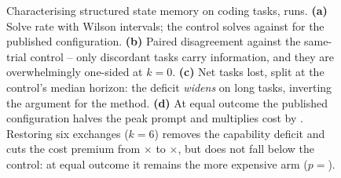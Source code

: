 \begin{figure}[t]
\caption{Characterising structured state memory on \EOneTasks{} coding tasks,
\EOneRuns{} runs. \textbf{(a)} Solve rate with Wilson intervals; the control
solves \SolveBase{} against \SolveTailZero{} for the published configuration.
\textbf{(b)} Paired disagreement against the same-trial control -- only
discordant tasks carry information, and they are overwhelmingly one-sided at
$k{=}0$. \textbf{(c)} Net tasks lost, split at the control's median horizon:
the deficit \emph{widens} on long tasks, inverting the argument for the method.
\textbf{(d)} At equal outcome the published configuration halves the peak
prompt and multiplies cost by \CostRatioTailZero. Restoring six exchanges
($k{=}6$) removes the capability deficit and cuts the cost premium from
\CostRatioTailZero$\times$ to \CostRatioTailSix$\times$, but does not fall below
the control: at equal outcome it remains the more expensive arm
($p={}$\CostSignPTailSix).}
\label{fig:fourpanel}
\end{figure}
